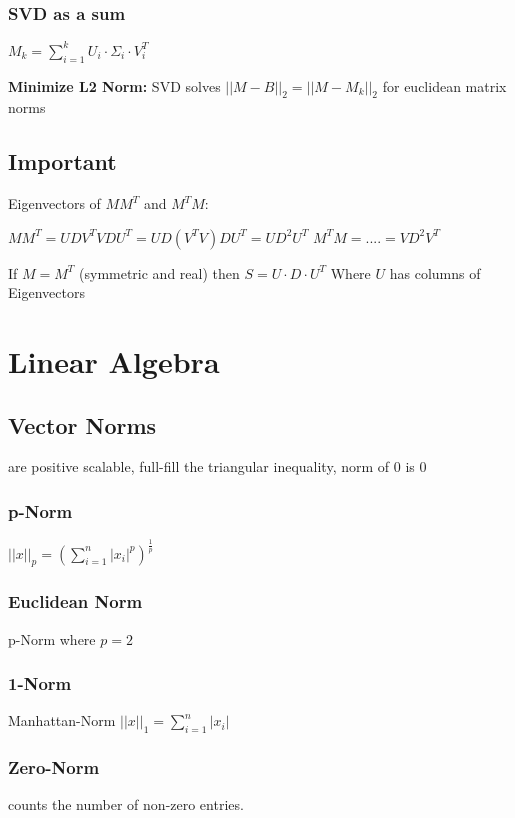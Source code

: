 \documentclass[11pt,twocolumn]{article}
\begin{document}
\subsubsection{SVD as a sum}

$ M_k = \sum_{i=1}^{k} {U_i \cdot \Sigma_i \cdot V^T_i} $
 
\textbf{Minimize L2 Norm:}
SVD solves $|| M - B ||_2 = || M - M_k ||_2$
for euclidean matrix norms

\subsection{Important} Eigenvectors of $MM^T$ and $M^TM$:


$MM^T = UDV^T VDU^T = UD (V^T V)DU^T = U D^2 U^T$
$M^TM =  ....  = V D^2 V^T$
 
If $M = M^T$ (symmetric and real) then
$S = U \cdot D \cdot U^T$
Where $U$ has columns of Eigenvectors


\section{Linear Algebra}
\subsection{Vector Norms}
are positive scalable, full-fill the triangular inequality, norm of 0 is 0

\subsubsection{p-Norm}
$ || x ||_p = \left( \sum_{i=1}^{n}{|x_i|^p} \right)^{\frac{1}{p}}$

\subsubsection{Euclidean Norm} 
p-Norm where $p=2$

\subsubsection{1-Norm}
Manhattan-Norm
$ ||x||_1 = \sum_{i=1}^{n}{|x_i|} $

\subsubsection{Zero-Norm} 
counts the number of non-zero entries.
\end{document}
